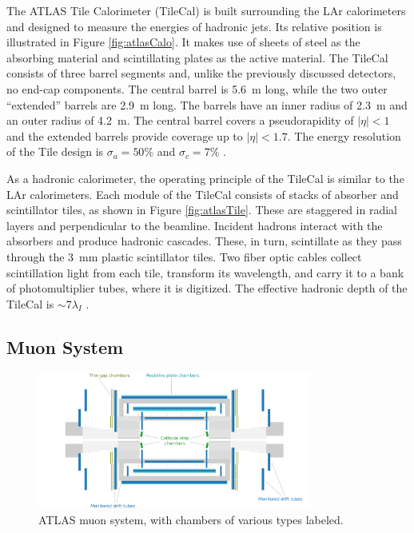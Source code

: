 The ATLAS Tile Calorimeter (TileCal) is built surrounding the LAr calorimeters and designed to measure the energies of hadronic jets.
Its relative position is illustrated in Figure \ref{fig:atlasCalo}.
It makes use of sheets of steel as the absorbing material and scintillating plates as the active material.
The TileCal consists of three barrel segments and, unlike the previously discussed detectors, no end-cap components.
The central barrel is 5.6~m long, while the two outer ``extended'' barrels are 2.9~m long.
The barrels have an inner radius of 2.3~m and an outer radius of 4.2~m.
The central barrel covers a pseudorapidity of $|\eta|<1$ and the extended barrels provide coverage up to $|\eta|<1.7$.
The energy resolution of the Tile design is $\sigma_a=50\%$ and $\sigma_c=7\%$  \cite{tileTdr}.

As a hadronic calorimeter, the operating principle of the TileCal is similar to the LAr calorimeters.
Each module of the TileCal consists of stacks of absorber and scintillator tiles, as shown in Figure \ref{fig:atlasTile}.
These are staggered in radial layers and perpendicular to the beamline.
Incident hadrons interact with the absorbers and produce hadronic cascades.
These, in turn, scintillate as they pass through the 3~mm plastic scintillator tiles.
Two fiber optic cables collect scintillation light from each tile, transform its wavelength, and carry it to a bank of photomultiplier tubes, where it is digitized.
The effective hadronic depth of the TileCal is $\sim7\lambda_I$  \cite{tile}.

\subsection{Muon System}

\begin{figure}[h!]
\captionsetup[subfigure]{position=b}
\centering
\includegraphics[width=0.8\textwidth]{figures/experiment/muonSys.pdf}
\caption{ATLAS muon system, with chambers of various types labeled.}
\label{fig:atlasMs}
\end{figure}

